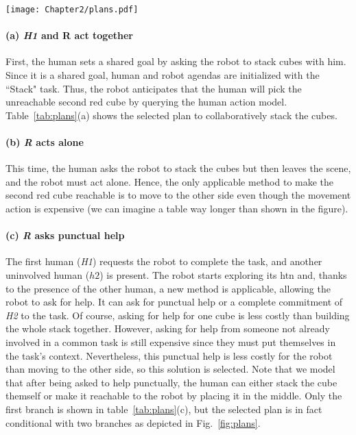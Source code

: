 \begin{sidewaysfigure}
    \centering 
    \texttt{[image: Chapter2/plans.pdf]}
    \caption{Illustration of the incremental exploration of various courses of actions corresponding to scenarios depicted in Fig.~\ref{fig:scenarios}(b), (c), and (d). Since \textit{H1} requests the robot to complete the task without establishing a shared goal, the robot agenda only contains the task to achieve, and the agenda of \textit{H2} starts empty.}
    \label{fig:plans}
\end{sidewaysfigure}

\paragraph{(a) \textit{H1} and R act together}
First, the human sets a shared goal by asking the robot to stack cubes with him. Since it is a shared goal, human and robot agendas are initialized with the ``Stack" task. Thus, the robot anticipates that the human will pick the unreachable second red cube by querying the human action model. Table~\ref {tab:plans}(a) shows the selected plan to collaboratively stack the cubes. 

\paragraph{(b) \textit{R} acts alone}
This time, the human asks the robot to stack the cubes but then leaves the scene, and the robot must act alone. Hence, the only applicable method to make the second red cube reachable is to move to the other side even though the movement action is expensive (we can imagine a table way longer than shown in the figure).

\paragraph{(c) \textit{R} asks punctual help}
The first human (\textit{H1}) requests the robot to complete the task, and another uninvolved human ($h2$) is present. The robot starts exploring its \acrshort{htn} and, thanks to the presence of the other human, a new method is applicable, allowing the robot to ask for help. It can ask for punctual help or a complete commitment of \textit{H2} to the task. Of course, asking for help for one cube is less costly than building the whole stack together. However, asking for help from someone not already involved in a common task is still expensive since they must put themselves in the task's context. 
Nevertheless, this punctual help is less costly for the robot than moving to the other side, so this solution is selected. Note that we model that after being asked to help punctually, the human can either stack the cube themself or make it reachable to the robot by placing it in the middle. Only the first branch is shown in table~\ref{tab:plans}(c), but the selected plan is in fact conditional with two branches as depicted in Fig.~\ref{fig:plans}.

